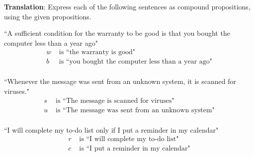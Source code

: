 \documentclass[12pt, oneside]{article}
\begin{document}
\vfill
\vfill

\newpage
{\bf Translation}: Express each of the following sentences as compound propositions, using
the given propositions.

\begin{multicols}{2}
``A sufficient condition for the warranty to be good is that you bought the computer less than a year ago"
\columnbreak
\begin{align*}
w &\text{ is  ``the warranty is good"} \\
b &\text{ is  ``you bought the computer less than a year ago"} \\
\end{align*}
\end{multicols}
\vfill

\begin{multicols}{2}
``Whenever the message was sent from an unknown system, it is scanned for viruses."
\columnbreak
\begin{align*}
s &\text{ is  ``The message is scanned for viruses"} \\
u &\text{ is  ``The message was sent from an unknown system"} \\
\end{align*}
\end{multicols}
\vfill

\begin{multicols}{2}
``I will complete my to-do list only if I put a reminder in my calendar"
\columnbreak
\begin{align*}
r &\text{ is  ``I will complete my to-do list"} \\
c &\text{ is  ``I put a reminder in my calendar"} \\
\end{align*}
\end{multicols}
\vfill
\end{document}
